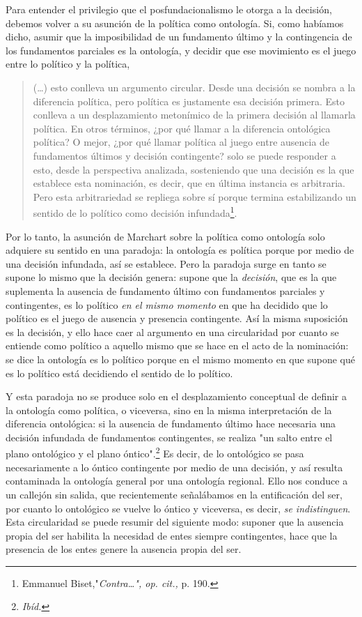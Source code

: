 Para entender el privilegio que el posfundacionalismo le otorga a la
decisión, debemos volver a su asunción de la política como ontología.
Si, como habíamos dicho, asumir que la imposibilidad de un fundamento
último y la contingencia de los fundamentos parciales es la ontología, y
decidir que ese movimiento es el juego entre lo político y la política,

\begin{quote}
(\dots) esto conlleva un argumento circular. Desde una decisión se
nombra a la diferencia política, pero política es justamente esa
decisión primera. Esto conlleva a un desplazamiento metonímico de la
primera decisión al llamarla política. En otros términos, ¿por qué
llamar a la diferencia ontológica política? O mejor, ¿por qué llamar
política al juego entre ausencia de fundamentos últimos y decisión
contingente? solo se puede responder a esto, desde la perspectiva
analizada, sosteniendo que una decisión es la que establece esta
nominación, es decir, que en última instancia es arbitraria. Pero esta
arbitrariedad se repliega sobre sí porque termina estabilizando un
sentido de lo político como decisión infundada\footnote{Emmanuel
  Biset,"\emph{Contra\ldots", op. cit.,} p. 190.}.
\end{quote}

Por lo tanto, la asunción de Marchart sobre la política como ontología
solo adquiere su sentido en una paradoja: la ontología es política
porque por medio de una decisión infundada, así se establece. Pero la
paradoja surge en tanto se supone lo mismo que la decisión genera:
supone que la \emph{decisión}, que es la que suplementa la ausencia de
fundamento último con fundamentos parciales y contingentes, es lo
político \emph{en el mismo momento} en que ha decidido que lo político
es el juego de ausencia y presencia contingente. Así la misma suposición
es la decisión, y ello hace caer al argumento en una circularidad por
cuanto se entiende como político a aquello mismo que se hace en el acto
de la nominación: se dice la ontología es lo político porque en el mismo
momento en que supone qué es lo político está decidiendo el sentido de
lo político.

Y esta paradoja no se produce solo en el desplazamiento conceptual de
definir a la ontología como política, o viceversa, sino en la misma
interpretación de la diferencia ontológica: si la ausencia de fundamento
último hace necesaria una decisión infundada de fundamentos
contingentes, se realiza "un salto entre el plano ontológico y el plano
óntico".\footnote{\emph{Ibíd.}} Es decir, de lo ontológico se pasa
necesariamente a lo óntico contingente por medio de una decisión, y así
resulta contaminada la ontología general por una ontología regional.
Ello nos conduce a un callejón sin salida, que recientemente señalábamos
en la entificación del ser, por cuanto lo ontológico se vuelve lo óntico
y viceversa, es decir, \emph{se indistinguen}. Esta circularidad se
puede resumir del siguiente modo: suponer que la ausencia propia del ser
habilita la necesidad de entes siempre contingentes, hace que la
presencia de los entes genere la ausencia propia del ser.

